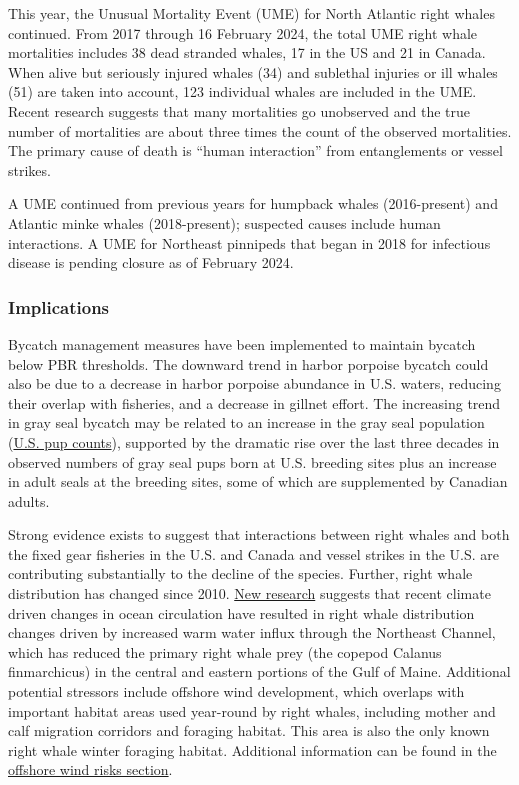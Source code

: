 \documentclass[
  10pt,
]{article}
\begin{document}
This year, the Unusual Mortality Event (UME) for North Atlantic right whales continued. From 2017 through 16 February 2024, the total UME right whale mortalities includes 38 dead stranded whales, 17 in the US and 21 in Canada. When alive but seriously injured whales (34) and sublethal injuries or ill whales (51) are taken into account, 123 individual whales are included in the UME. Recent research suggests that many mortalities go unobserved and the true number of mortalities are about three times the count of the observed mortalities. The primary cause of death is ``human interaction'' from entanglements or vessel strikes.

A UME continued from previous years for humpback whales (2016-present) and Atlantic minke whales (2018-present); suspected causes include human interactions. A UME for Northeast pinnipeds that began in 2018 for infectious disease is pending closure as of February 2024.

\hypertarget{implications-5}{%
\subsubsection{Implications}\label{implications-5}}

Bycatch management measures have been implemented to maintain bycatch below PBR thresholds. The downward trend in harbor porpoise bycatch could also be due to a decrease in harbor porpoise abundance in U.S. waters, reducing their overlap with fisheries, and a decrease in gillnet effort. The increasing trend in gray seal bycatch may be related to an increase in the gray seal population (\href{https://noaa-edab.github.io/catalog/seal_pups.html}{U.S. pup counts}), supported by the dramatic rise over the last three decades in observed numbers of gray seal pups born at U.S. breeding sites plus an increase in adult seals at the breeding sites, some of which are supplemented by Canadian adults.

Strong evidence exists to suggest that interactions between right whales and both the fixed gear fisheries in the U.S. and Canada and vessel strikes in the U.S. are contributing substantially to the decline of the species. Further, right whale distribution has changed since 2010. \href{https://noaa-edab.github.io/catalog/narw.html}{New research} suggests that recent climate driven changes in ocean circulation have resulted in right whale distribution changes driven by increased warm water influx through the Northeast Channel, which has reduced the primary right whale prey (the copepod Calanus finmarchicus) in the central and eastern portions of the Gulf of Maine. Additional potential stressors include offshore wind development, which overlaps with important habitat areas used year-round by right whales, including mother and calf migration corridors and foraging habitat. This area is also the only known right whale winter foraging habitat. Additional information can be found in the \protect\hyperlink{other-ocean-uses-offshore-wind}{offshore wind risks section}.
\end{document}
